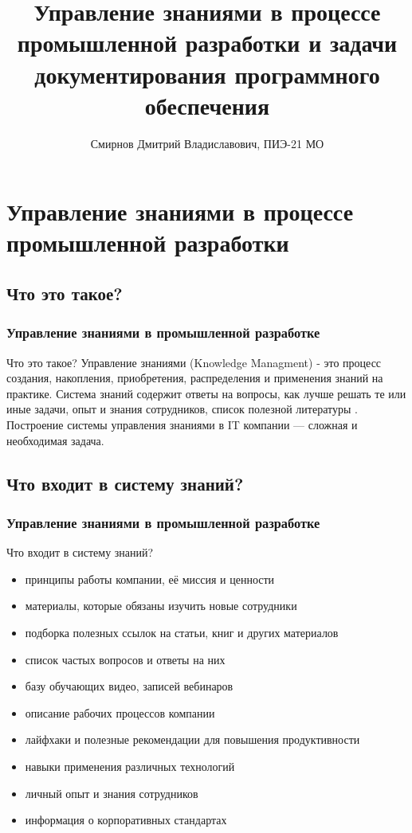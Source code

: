 \documentclass{industrial-development}
\title{Управление знаниями в процессе промышленной разработки и задачи документирования программного обеспечения}
\author{Смирнов Дмитрий Владиславович, ПИЭ-21 МО}
\date{}
\begin{document}
\begin{frame}
  \titlepage
\end{frame}


\section{Управление знаниями в процессе промышленной разработки}

\subsection{Что это такое?}

\begin{frame} \frametitle{Управление знаниями в промышленной разработке}
  \begin{block}{Что это такое?}
  Управление знаниями (Knowledge Managment) - это процесс создания, накопления, приобретения, распределения и применения знаний на практике. Система знаний содержит ответы на вопросы,  как лучше решать те или иные задачи, опыт и знания сотрудников, список полезной литературы . Построение системы управления знаниями в IT компании — сложная и необходимая задача.
  \end{block}
\end{frame}

\subsection{Что входит в систему знаний?}

\begin{frame} \frametitle{Управление знаниями в промышленной разработке}
  \begin{block}{Что входит в систему знаний?}
  \end{block}
  
  \begin{itemize}
  \item принципы работы компании, её миссия и ценности
  \item материалы, которые обязаны изучить новые сотрудники
  \item подборка полезных ссылок на статьи, книг и других материалов
  \item список частых вопросов и ответы на них
  \item базу обучающих видео, записей вебинаров
  \item описание рабочих процессов компании
  \item лайфхаки и полезные рекомендации для повышения продуктивности
  \item навыки применения различных технологий
  \item личный опыт и знания сотрудников
  \item информация о корпоративных стандартах
  \end{itemize}
\end{frame}
\end{document}
